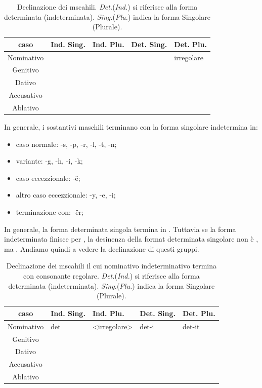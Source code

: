 \begin{table}[H]
    \centering
    \begin{tabular}{cllll}
        \toprule
        caso        & Ind. Sing.    & Ind. Plu. & Det. Sing.    & Det. Plu. \\
        \midrule
        Nominativo  &           &       &                & irregolare \\
        Genitivo    & & & & \\
        Dativo      & & & & \\
        Accusativo  & & & & \\
        Ablativo    & & & & \\
        \bottomrule
    \end{tabular}
    \caption{Declinazione dei mscahili. \textit{Det.}(\textit{Ind.}) si riferisce alla forma determinata (indeterminata). \textit{Sing.}(\textit{Plu.}) indica la forma Singolare (Plurale).}
\end{table}

In generale, i sostantivi maschili terminano con la forma singolare indetermina in:

\begin{itemize}
    \item caso normale: -s, -p, -r, -l, -t, -n;
    \item variante: -g, -h, -i, -k;
    \item caso eccezzionale: -ë;
    \item altro caso eccezzionale: -y, -e, -i;
    \item terminazione con: -ër;
\end{itemize}

In generale, la forma determinata singola termina in . Tuttavia se la forma indeterminata finisce per , la desinenza della format determinata singolare non è , ma \cite{vocedellaquila:declinazionemaschili}. Andiamo quindi a vedere la declinazione di questi gruppi.

\begin{table}[H]
    \centering
    \begin{tabular}{cllll}
        \toprule
        caso        & Ind. Sing.    & Ind. Plu. & Det. Sing.    & Det. Plu. \\
        \midrule
        Nominativo  & det          & <irregolare>      & det-i               & det-it \\
        Genitivo    & & & & \\
        Dativo      & & & & \\
        Accusativo  & & & & \\
        Ablativo    & & & & \\
        \bottomrule
    \end{tabular}
    \caption{Declinazione dei mscahili il cui nominativo indeterminativo termina con consonante regolare. \textit{Det.}(\textit{Ind.}) si riferisce alla forma determinata (indeterminata). \textit{Sing.}(\textit{Plu.}) indica la forma Singolare (Plurale).}
\end{table}

